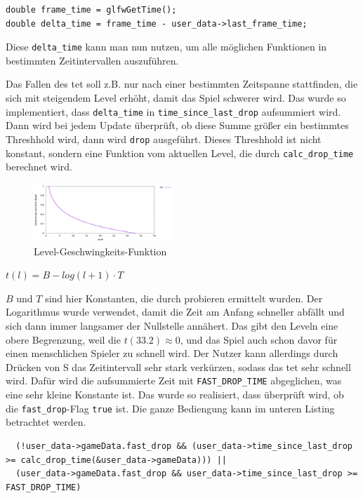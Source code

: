 \documentclass[11pt]{article}
\newcommand{\lstin}[1]{\lstinline[language=C]{#1}}
\begin{document}
\begin{lstlisting}
double frame_time = glfwGetTime();
double delta_time = frame_time - user_data->last_frame_time;
\end{lstlisting}

Diese \lstin{delta_time} kann man nun nutzen, um alle möglichen Funktionen in bestimmten Zeitintervallen auszuführen.

Das Fallen des \gls{tet} soll z.B. nur nach einer bestimmten Zeitspanne stattfinden, 
die sich mit steigendem Level erhöht, damit das Spiel schwerer wird. Das wurde so implementiert, 
dass \lstin{delta_time} in \lstin{time_since_last_drop} aufsummiert wird. Dann wird bei jedem Update überprüft, 
ob diese Summe größer ein bestimmtes Threshhold wird, dann wird \lstin{drop} ausgeführt. 
Dieses Threshhold ist nicht konstant, sondern eine Funktion vom aktuellen Level, die durch \lstin{calc_drop_time} berechnet wird.

\begin{figure}
  \centering
  \includegraphics[width=200px]{../plt/level_speed.png}
  \caption{Level-Geschwingkeits-Funktion}
\end{figure}

\begin{center}
$t(l) = B - log(l + 1) \cdot T$
\end{center}

$B$ und $T$ sind hier Konstanten, die durch probieren ermittelt wurden. Der Logarithmus wurde verwendet, 
damit die Zeit am Anfang schneller abfällt und sich dann immer langsamer der Nullstelle annähert. 
Das gibt den Leveln eine obere Begrenzung, weil die $t(33.2) \approx 0$, und das Spiel auch schon davor für einen menschlichen Spieler zu schnell wird.  
Der Nutzer kann allerdings durch Drücken von S das Zeitintervall sehr stark verkürzen, sodass das \gls{tet} sehr schnell wird.
Dafür wird die aufsummierte Zeit mit \lstin{FAST_DROP_TIME} abgeglichen, was eine sehr kleine Konstante ist.
Das wurde so realisiert, dass überprüft wird, ob die \lstin{fast_drop}-Flag \lstin{true} ist. Die ganze Bediengung kann im unteren Listing betrachtet werden.

\begin{lstlisting}
  (!user_data->gameData.fast_drop && (user_data->time_since_last_drop >= calc_drop_time(&user_data->gameData))) ||
  (user_data->gameData.fast_drop && user_data->time_since_last_drop >= FAST_DROP_TIME)
\end{lstlisting}
\end{document}
